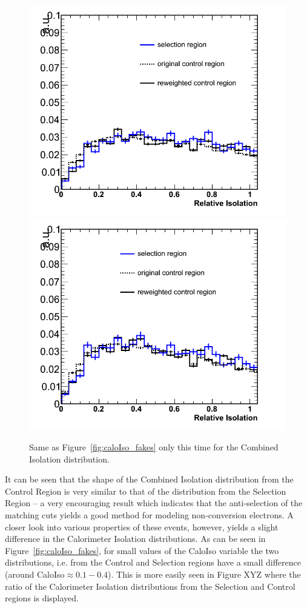 \begin{figure}[h!]
\centering
\includegraphics[scale=0.28]{Plots/combIso_pt10_fakes.png}
\includegraphics[scale=0.28]{Plots/combIso_pt20_fakes.png}
\caption{Same as Figure~\ref{fig:caloIso_fakes} only this time for the Combined Isolation distribution.}\label{fig:combIso_fakes}
\end{figure}

It can be seen that the shape of the Combined Isolation distribution from the Control Region is very similar to that of the distribution from the Selection Region -- a very encouraging result which indicates that the anti-selection of the matching cuts yields a good method for modeling non-conversion electrons. A closer look into various properties of these events, however, yields a slight difference in the Calorimeter Isolation distributions.  As can be seen in Figure~\ref{fig:caloIso_fakes}, for small values of the CaloIso variable the two distributions, i.e. from the Control and Selection regions have a small difference (around CaloIso$\approx 0.1-0.4$).  This is more easily seen in Figure XYZ where the ratio of the Calorimeter Isolation distributions from the Selection and Control regions is displayed. 

